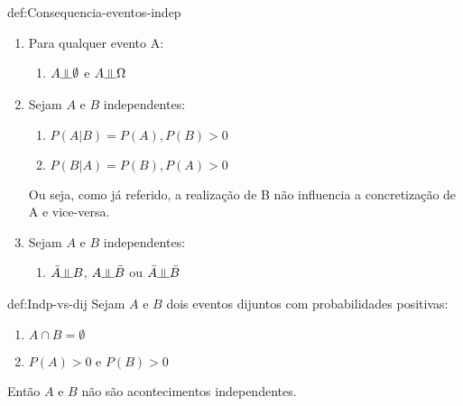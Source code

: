 \begin{theo}{def:Consequencia-eventos-indep}\label{def:Consequencia-eventos-indep}
    \begin{enumerate}
        \item Para qualquer evento A:
        \vspace{-0.5 em}
        \begin{enumerate}[label=$\bullet$]
            \item $A\indep \emptyset$ e $A\indep \Omega$
        \end{enumerate}
        \item Sejam $A$ e $B$ independentes:
        \vspace{-0.5 em}
        \begin{enumerate}[label=$\bullet$]
            \item $P(A|B) = P(A), P(B) > 0$
            \item $P(B|A) = P(B), P(A) > 0$
        \end{enumerate}
        Ou seja, como já referido, a realização de B não influencia a
        concretização de A e vice-versa.
        \item Sejam $A$ e $B$ independentes:
        \vspace{-0.5 em}
        \begin{enumerate}[label=$\bullet$]
            \item $\bar{A} \indep B$, $A \indep \bar{B}$ ou $\bar{A} \indep \bar{B}$
        \end{enumerate}
    \end{enumerate}
\end{theo}

\begin{theo}{def:Indp-vs-dij}\label{def:Indp-vs-dij}
    Sejam $A$ e $B$ dois eventos dijuntos com probabilidades positivas:

    \vspace{-0.75em}
    \begin{enumerate}[label=$\bullet$]
        \item $A \cap B = \emptyset$
        \item $P(A) > 0$ e $P(B) > 0$
    \end{enumerate}
    
    \vspace{-0.75em}
    \noindent Então $A$ e $B$ não são acontecimentos independentes.
\end{theo}

